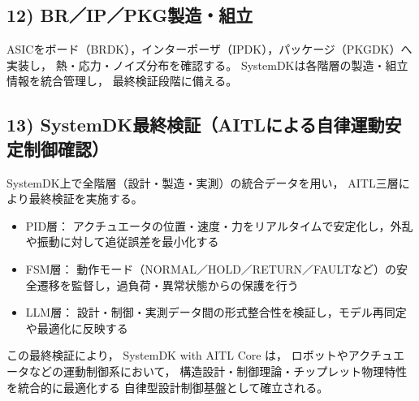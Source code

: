 \subsection{12) BR／IP／PKG製造・組立}
ASICをボード（BRDK），インターポーザ（IPDK），パッケージ（PKGDK）へ実装し，
熱・応力・ノイズ分布を確認する。
SystemDKは各階層の製造・組立情報を統合管理し，
最終検証段階に備える。

\subsection{13) SystemDK最終検証（AITLによる自律運動安定制御確認）}
SystemDK上で全階層（設計・製造・実測）の統合データを用い，
AITL三層により最終検証を実施する。

\begin{itemize}
  \item PID層： アクチュエータの位置・速度・力をリアルタイムで安定化し，外乱や振動に対して追従誤差を最小化する  
  \item FSM層： 動作モード（NORMAL／HOLD／RETURN／FAULTなど）の安全遷移を監督し，過負荷・異常状態からの保護を行う  
  \item LLM層： 設計・制御・実測データ間の形式整合性を検証し，モデル再同定や最適化に反映する  
\end{itemize}

この最終検証により，
SystemDK with AITL Core は，
ロボットやアクチュエータなどの運動制御系において，
構造設計・制御理論・チップレット物理特性を統合的に最適化する
自律型設計制御基盤として確立される。
